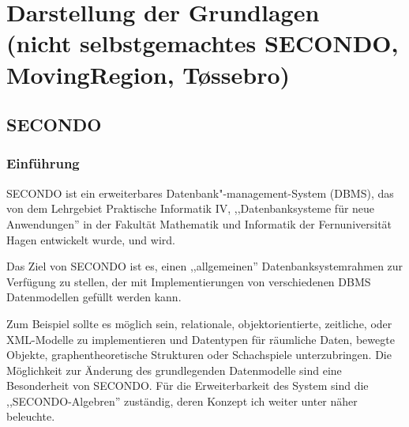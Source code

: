 
\chapter[Darstellung der Grundlagen \anmerkung{30-40 Seiten}]{Darstellung der Grundlagen\\
\normalsize{(nicht selbstgemachtes
SECONDO,
MovingRegion,
T\o{}ssebro)}} \label{Kapitel2}
\minitoc
\newpage
\section{SECONDO }\label{SecondoEinfuehrung}

\subsection{Einführung}
SECONDO ist ein erweiterbares Datenbank"-management-System (DBMS), das von dem Lehrgebiet Praktische Informatik IV, ,,Datenbanksysteme für neue Anwendungen'' in der Fakultät Mathematik und Informatik der Fernuniversität Hagen entwickelt wurde, und wird.

Das Ziel von SECONDO ist es, einen ,,allgemeinen'' Datenbanksystemrahmen zur Verfügung zu stellen, der mit Implementierungen von verschiedenen DBMS Datenmodellen gefüllt werden kann.

Zum Beispiel sollte es möglich sein, relationale, objektorientierte, zeitliche, oder XML-Modelle zu implementieren und Datentypen für räumliche Daten, bewegte Objekte, graphentheoretische Strukturen oder Schachspiele unterzubringen. Die Möglichkeit zur Änderung des grundlegenden Datenmodelle sind eine Besonderheit von SECONDO. Für die Erweiterbarkeit des System sind die ,,SECONDO-Algebren'' zuständig, deren Konzept ich weiter unter näher beleuchte.

